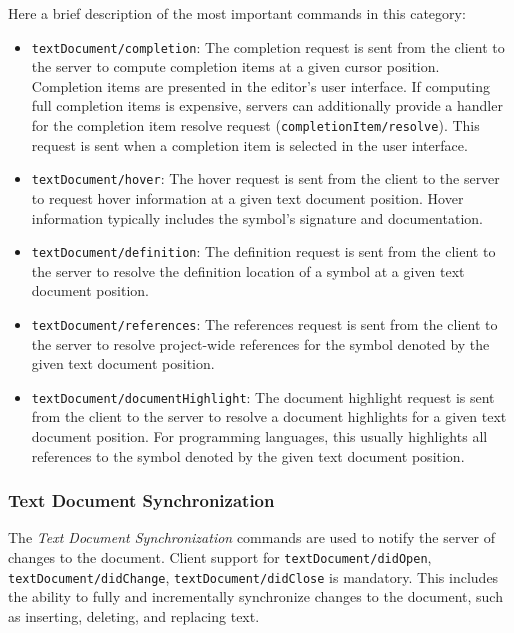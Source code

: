 Here a brief description of the most important commands in this category:
\begin{itemize}
    \item \texttt{textDocument/completion}: The completion request is sent from the client to the server to compute completion items at a given cursor position. Completion items are presented in the editor's user interface. If computing full completion items is expensive, servers can additionally provide a handler for the completion item resolve request (\texttt{completionItem/resolve}). This request is sent when a completion item is selected in the user interface.
    \item \texttt{textDocument/hover}: The hover request is sent from the client to the server to request hover information at a given text document position. Hover information typically includes the symbol's signature and documentation.
    \item \texttt{textDocument/definition}: The definition request is sent from the client to the server to resolve the definition location of a symbol at a given text document position.
    \item \texttt{textDocument/references}: The references request is sent from the client to the server to resolve project-wide references for the symbol denoted by the given text document position.
    \item \texttt{textDocument/documentHighlight}: The document highlight request is sent from the client to the server to resolve a document highlights for a given text document position. For programming languages, this usually highlights all references to the symbol denoted by the given text document position.
\end{itemize}

\subsubsection{Text Document Synchronization}\label{subsec:TextDocumentSynchronization}
The \textit{Text Document Synchronization} commands are used to notify the server of changes to the document. Client support for \texttt{textDocument/didOpen}, \texttt{textDocument/didChange}, \texttt{textDocument/didClose} is mandatory. This includes the ability to fully and incrementally synchronize changes to the document, such as inserting, deleting, and replacing text.

